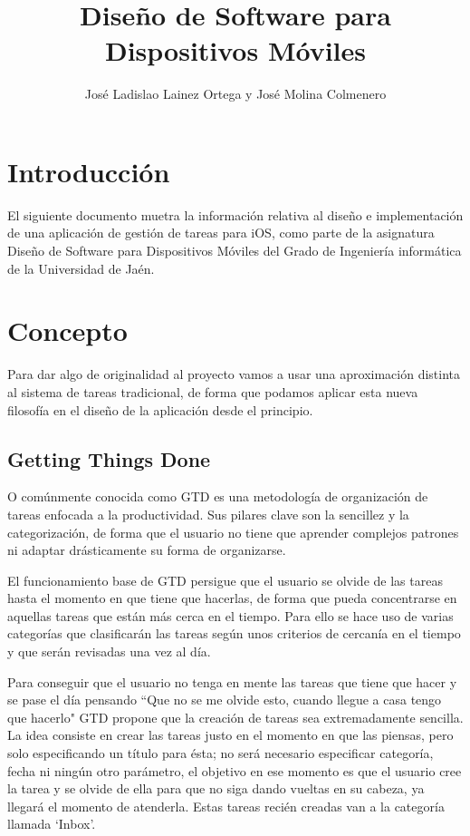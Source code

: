 \documentclass[parskip=half*]{scrartcl}
\title{Dise\~no de Software para Dispositivos M\'oviles}
\author{Jos\'e Ladislao Lainez Ortega y Jos\'e Molina Colmenero}
\begin{document}

\maketitle
\vfill
\tableofcontents

\newpage


\section{Introducci\'on}
El siguiente documento muetra la informaci\'on relativa al dise\~no e implementaci\'on de una aplicaci\'on de gesti\'on de tareas para iOS, como parte de la asignatura Dise\~no de Software para Dispositivos M\'oviles del Grado de Ingenier\'ia inform\'atica de la Universidad de Ja\'en.

\section{Concepto}
Para dar algo de originalidad al proyecto vamos a usar una aproximaci\'on distinta al sistema de tareas tradicional, de forma que podamos aplicar esta nueva filosof\'ia en el dise\~no de la aplicaci\'on desde el principio.

\subsection{Getting Things Done}
O com\'unmente conocida como GTD es una metodolog\'ia de organizaci\'on de tareas enfocada a la productividad. Sus pilares clave son la sencillez y la categorizaci\'on, de forma que el usuario no tiene que aprender complejos patrones ni adaptar dr\'asticamente su forma de organizarse.

El funcionamiento base de GTD persigue que el usuario se olvide de las tareas hasta el momento en que tiene que hacerlas, de forma que pueda concentrarse en aquellas tareas que est\'an m\'as cerca en el tiempo. Para ello se hace uso de varias categor\'ias que clasificar\'an las tareas seg\'un unos criterios de cercan\'ia en el tiempo y que ser\'an revisadas una vez al d\'ia.

Para conseguir que el usuario no tenga en mente las tareas que tiene que hacer y se pase el d\'ia pensando ``Que no se me olvide esto, cuando llegue a casa tengo que hacerlo" GTD propone que la creaci\'on de tareas sea extremadamente sencilla. La idea consiste en crear las tareas justo en el momento en que las piensas, pero solo especificando un t\'itulo para \'esta; no ser\'a necesario especificar categor\'ia, fecha ni ning\'un otro par\'ametro, el objetivo en ese momento es que el usuario cree la tarea y se olvide de ella para que no siga dando vueltas en su cabeza, ya llegar\'a el momento de atenderla. Estas tareas reci\'en creadas van a la categor\'ia llamada `Inbox'.
\end{document}
